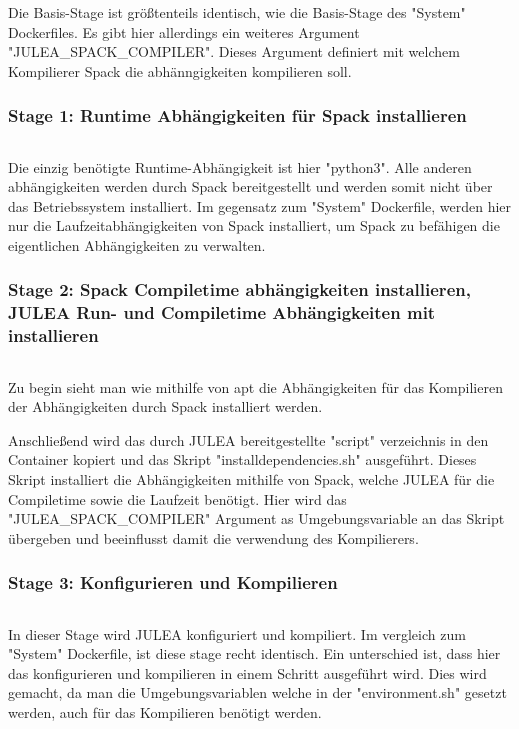 Die Basis-Stage ist größtenteils identisch, wie die Basis-Stage des "System" Dockerfiles. Es gibt hier allerdings ein weiteres Argument "JULEA\_SPACK\_COMPILER". Dieses Argument definiert mit welchem Kompilierer Spack die abhänngigkeiten kompilieren soll. 

\subsubsection{Stage 1: Runtime Abhängigkeiten für Spack installieren}

\inputminted[firstline=10,lastline=13]{dockerfile}{./code-examples/Dockerfile.spack}

Die einzig benötigte Runtime-Abhängigkeit ist hier "python3". Alle anderen abhängigkeiten werden durch Spack bereitgestellt und werden somit nicht über das Betriebssystem installiert. Im gegensatz zum "System" Dockerfile, werden hier nur die Laufzeitabhängigkeiten von Spack installiert, um Spack zu befähigen die eigentlichen Abhängigkeiten zu verwalten.


\subsubsection{Stage 2: Spack Compiletime abhängigkeiten installieren, JULEA Run- und Compiletime Abhängigkeiten mit installieren}

\inputminted[firstline=15,lastline=29]{dockerfile}{./code-examples/Dockerfile.spack}

Zu begin sieht man wie mithilfe von apt die Abhängigkeiten für das Kompilieren der Abhängigkeiten durch Spack installiert werden. 

Anschließend wird das durch JULEA bereitgestellte "script" verzeichnis in den Container kopiert und das Skript "install\-dependencies.sh" ausgeführt. Dieses Skript installiert die Abhängigkeiten mithilfe von Spack, welche JULEA für die Compiletime sowie die Laufzeit benötigt. Hier wird das "JULEA\_SPACK\_COMPILER" Argument as Umgebungsvariable an das Skript übergeben und beeinflusst damit die verwendung des Kompilierers.


\subsubsection{Stage 3: Konfigurieren und Kompilieren}

\inputminted[firstline=32,lastline=40]{dockerfile}{./code-examples/Dockerfile.spack}

In dieser Stage wird JULEA konfiguriert und kompiliert. Im vergleich zum "System" Dockerfile, ist diese stage recht identisch. Ein unterschied ist, dass hier das konfigurieren und kompilieren in einem Schritt ausgeführt wird. Dies wird gemacht, da man die Umgebungsvariablen welche in der "environment.sh" gesetzt werden, auch für das Kompilieren benötigt werden. 

